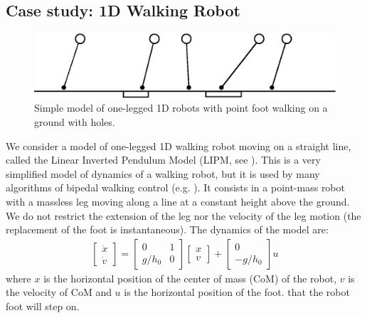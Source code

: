 \subsection{Case study: 1D {\color{black} Walking} Robot }

\begin{figure}
	\centering
	\includegraphics[width=0.5\linewidth]{pic/hop-rob}
	\caption{{\color{black} Simple model of one-legged 1D} robots with point foot {\color{black} walking} on a ground with holes. %
	}	
	\label{fig:hoprob}
\end{figure}

{\color{black} We consider a model of one-legged 1D walking robot moving on a straight line, called the Linear Inverted Pendulum Model (LIPM, see \cite{kajita20013d}). This is a very simplified model of dynamics of a walking robot, but it is used by many algorithms of bipedal walking control (e.g. \cite{englsberger2011bipedal}). It consists in a point-mass robot with a massless leg moving along a line at a constant height above the ground. We do not restrict the extension of the leg nor the velocity of the leg motion (the replacement of the foot is instantaneous). The dynamics of the model are: }
\begin{align}
\begin{bmatrix}
\dot{x}\\
\dot{v}
\end{bmatrix} = \begin{bmatrix}
0 & 1\\
g/h_0 & 0
\end{bmatrix}\begin{bmatrix}
x\\
v
\end{bmatrix}+\begin{bmatrix}
0\\-g/h_0
\end{bmatrix} u \label{eqn: model}
\end{align}
where $x$ is the {\color{black} horizontal position of the} center of mass (CoM) of the robot, $v$ is the velocity of CoM and $ u $ is {\color{black} the horizontal position of the foot.} that the robot foot will step on. 


